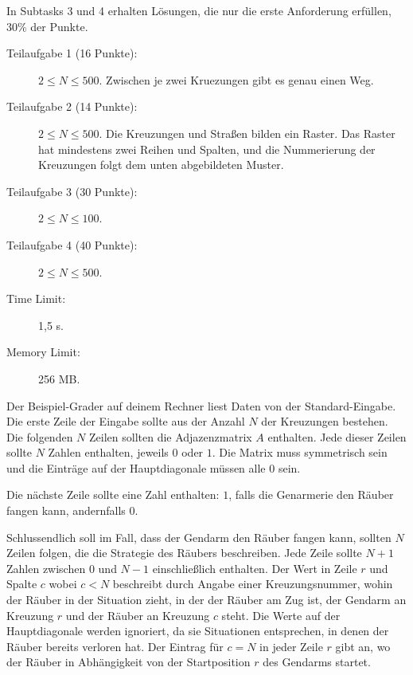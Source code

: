 \documentclass{boi2014-de}
\begin{document}
    In Subtasks 3 und 4 erhalten Lösungen, 
    die nur die erste Anforderung erfüllen, 30\% der Punkte.

    \begin{description}
        \item[Teilaufgabe 1 (16 Punkte):] $2 \le N \le 500$. 
        Zwischen je zwei Kruezungen gibt es genau einen Weg.
        \item[Teilaufgabe 2 (14 Punkte):] $2 \le N \le 500$. 
        Die Kreuzungen und Straßen bilden ein Raster.  Das Raster hat mindestens zwei Reihen und Spalten,
        und die Nummerierung der Kreuzungen folgt dem unten abgebildeten Muster.
        \begin{figure}[h!]
           \centering
        \end{figure}
        \item[Teilaufgabe 3 (30 Punkte):] $2 \le N \le 100$.
        \item[Teilaufgabe 4 (40 Punkte):] $2 \le N \le 500$.
    \end{description}

    \Constraints
    
    \begin{description}
        \item[Time Limit:] 1,5 s.
        \item[Memory Limit:] 256 MB.
    \end{description}

    \Experimentation
    Der Beispiel-Grader auf deinem Rechner liest Daten von der Standard-Eingabe.
    Die erste Zeile der Eingabe sollte aus der Anzahl $N$ der Kreuzungen bestehen.
    Die folgenden $N$ Zeilen sollten die Adjazenzmatrix $A$ enthalten.
    Jede dieser Zeilen sollte $N$ Zahlen enthalten, jeweils $0$ oder $1$.
    Die Matrix muss symmetrisch sein und die Einträge auf der Hauptdiagonale müssen alle $0$ sein.

    Die nächste Zeile sollte eine Zahl enthalten: $1$, falls die Genarmerie den Räuber fangen kann, andernfalls $0$.
    
    Schlussendlich soll im Fall, dass der Gendarm den Räuber fangen kann, sollten $N$ Zeilen folgen, die die Strategie des Räubers beschreiben. Jede Zeile sollte $N+1$ Zahlen zwischen $0$ und $N-1$ einschließlich enthalten. Der Wert in Zeile $r$ und Spalte $c$ wobei $c<N$ beschreibt durch Angabe einer Kreuzungsnummer, wohin der Räuber in der Situation zieht, in der der Räuber am Zug ist, der Gendarm an Kreuzung $r$ und der Räuber an Kreuzung $c$ steht. Die Werte auf der Hauptdiagonale werden ignoriert, da sie Situationen entsprechen, in denen der Räuber bereits verloren hat. Der Eintrag für $c=N$ in jeder Zeile $r$ gibt an, wo der Räuber in Abhängigkeit von der Startposition $r$ des Gendarms startet.
    
\end{document}
